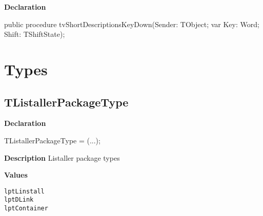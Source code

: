 \documentclass{report}
\newif\ifpdf
\begin{document}
\label{prjwizard.TfrmProjectWizard-tvShortDescriptionsKeyDown}
\begin{list}{}{
\setlength{\itemindent}{0cm}
\setlength{\listparindent}{0cm}
\setlength{\leftmargin}{\evensidemargin}
\addtolength{\leftmargin}{\tmplength}
\settowidth{\labelsep}{X}
\addtolength{\leftmargin}{\labelsep}
\setlength{\labelwidth}{\tmplength}
}
\item[\textbf{Declaration}\hfill]
\ifpdf
\begin{flushleft}
\fi
\begin{ttfamily}
public procedure tvShortDescriptionsKeyDown(Sender: TObject; var Key: Word; Shift: TShiftState);\end{ttfamily}

\ifpdf
\end{flushleft}
\fi

\end{list}
\section{Types}
\ifpdf
\subsection*{\large{\textbf{TListallerPackageType}}\normalsize\hspace{1ex}\hrulefill}
\else
\subsection*{TListallerPackageType}
\fi
\label{prjwizard-TListallerPackageType}
\begin{list}{}{
\setlength{\itemindent}{0cm}
\setlength{\listparindent}{0cm}
\setlength{\leftmargin}{\evensidemargin}
\addtolength{\leftmargin}{\tmplength}
\settowidth{\labelsep}{X}
\addtolength{\leftmargin}{\labelsep}
\setlength{\labelwidth}{\tmplength}
}
\item[\textbf{Declaration}\hfill]
\ifpdf
\begin{flushleft}
\fi
\begin{ttfamily}
TListallerPackageType = (...);\end{ttfamily}

\ifpdf
\end{flushleft}
\fi

\par
\item[\textbf{Description}]
Listaller package types\item[\textbf{Values}]
\begin{description}
\item[\texttt{lptLinstall}]  
\item[\texttt{lptDLink}]  
\item[\texttt{lptContainer}]  
\end{description}


\end{list}
\ifpdf
\end{document}
